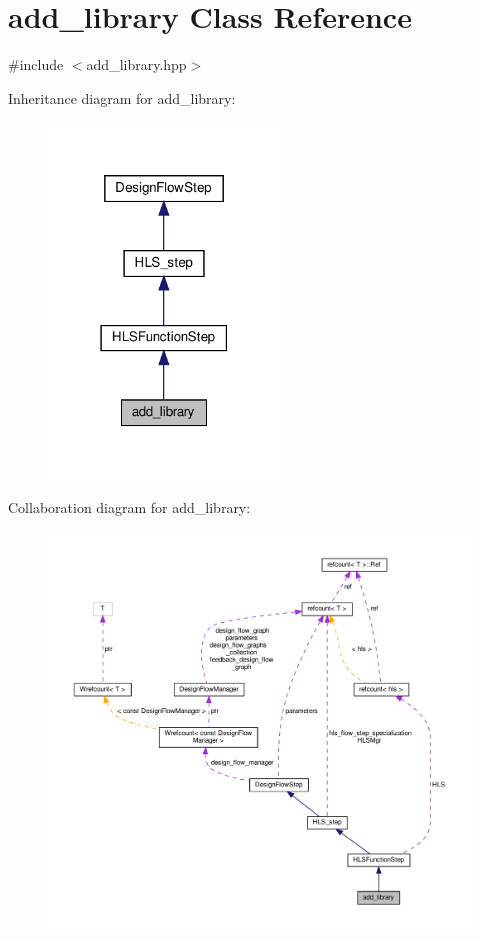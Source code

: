 \hypertarget{classadd__library}{}\section{add\+\_\+library Class Reference}
\label{classadd__library}


{\ttfamily \#include $<$add\+\_\+library.\+hpp$>$}



Inheritance diagram for add\+\_\+library\+:
\nopagebreak
\begin{figure}[H]
\begin{center}
\leavevmode
\includegraphics[width=174pt]{d4/dd8/classadd__library__inherit__graph}
\end{center}
\end{figure}


Collaboration diagram for add\+\_\+library\+:
\nopagebreak
\begin{figure}[H]
\begin{center}
\leavevmode
\includegraphics[width=350pt]{d6/d87/classadd__library__coll__graph}
\end{center}
\end{figure}
